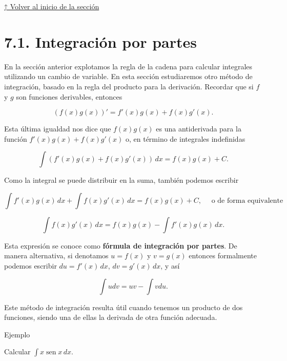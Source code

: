 \documentclass[
  letterpaper,
]{book}
\theoremstyle{plain}
\theoremstyle{remark}
\begin{document}
\hyperref[seccion_5.5]{↑ Volver al inicio de la sección}

\section{7.1. Integración por partes}\label{seccion_7.1}

En la sección anterior explotamos la regla de la cadena para calcular
integrales utilizando un cambio de variable. En esta sección
estudiaremos otro método de integración, basado en la regla del producto
para la derivación. Recordar que si \(f\) y \(g\) son funciones
derivables, entonces

\[
(f(x)g(x))' = f'(x)g(x) + f(x)g'(x).
\]

Esta última igualdad nos dice que \(f(x)g(x)\) es una antiderivada para
la función \(f'(x)g(x) + f(x)g'(x)\) o, en término de integrales
indefinidas

\[
\int (f'(x)g(x) + f(x)g'(x))\,dx =f(x)g(x)+C.
\]

Como la integral se puede distribuir en la suma, también podemos
escribir

\[
\int f'(x)g(x)\,dx + \int f(x)g'(x)\,dx =f(x)g(x)+C, \quad \text{ o de forma equivalente } 
\]

\label{form-partes1}
\[
\int f(x)g'(x)\,dx = f(x)g(x) - \int f'(x)g(x)\,dx.
\]

Esta expresión se conoce como \textbf{fórmula de integración por
partes}. De manera alternativa, si denotamos \(u=f(x)\) y \(v=g(x)\)
entonces formalmente podemos escribir \(du=f'(x)\,dx\),
\(dv=g'(x)\,dx\), y así

\label{form-partes2}
\[
\int udv = uv - \int vdu.
\]

Este método de integración resulta útil cuando tenemos un producto de
dos funciones, siendo una de ellas la derivada de otra función adecuada.

Ejemplo

Calcular \(\displaystyle \int x\operatorname{sen} x\,dx\).
\end{document}
